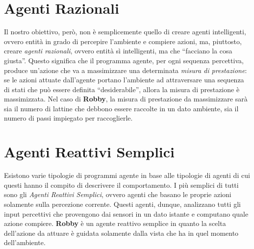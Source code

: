 \section{Agenti Razionali}
Il nostro obiettivo, però, non è semplicemente quello di creare agenti
intelligenti, ovvero entità in grado di percepire l'ambiente e compiere azioni,
ma, piuttosto, creare \textit{agenti razionali}, ovvero entità sì intelligenti,
ma che ``facciano la cosa giusta''. Questo significa che il programma agente,
per ogni sequenza percettiva, produce un'azione che va a massimizzare una
determinata \textit{misura di prestazione}: se le azioni attuate dall'agente
portano l'ambiente ad attraversare una sequenza di stati che può essere definita
``desiderabile'', allora la misura di prestazione è massimizzata.\newline
Nel caso di \textbf{Robby}, la misura di prestazione da massimizzare sarà sia il
numero di lattine che debbono essere raccolte in un dato ambiente, sia il numero
di passi impiegato per raccoglierle.



\section{Agenti Reattivi Semplici}
Esistono varie tipologie di programmi agente in base alle tipologie di agenti
di cui questi hanno il compito di descrivere il comportamento. I più semplici di
tutti sono gli \textit{Agenti Reattivi Semplici}, ovvero agenti che basano le
proprie azioni solamente sulla percezione corrente. Questi agenti, dunque,
analizzano tutti gli input percettivi che provengono dai sensori in un dato
istante e computano quale azione compiere.\newline
\textbf{Robby} è un agente reattivo semplice in quanto la scelta dell'azione da
attuare è guidata solamente dalla vista che ha in quel momento dell'ambiente.




